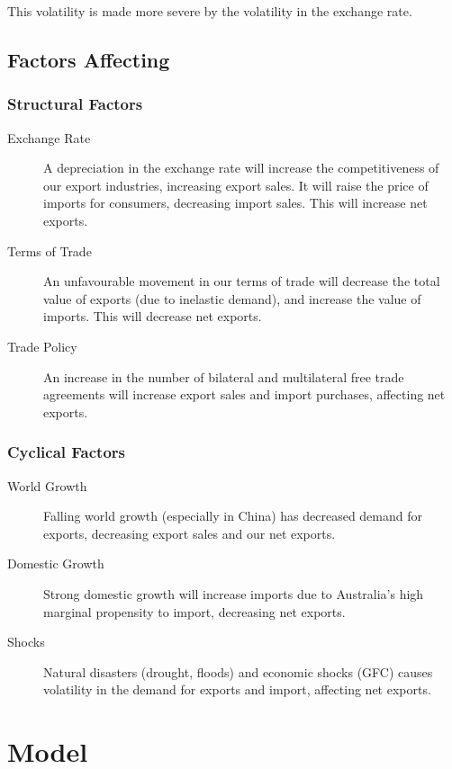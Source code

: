 \documentclass[a4paper,11pt]{article}
\begin{document}
This volatility is made more severe by the volatility in the exchange rate.


\subsection{Factors Affecting}

\subsubsection{Structural Factors}

\begin{description}
\item [Exchange Rate] A depreciation in the exchange rate will increase the
	competitiveness of our export industries, increasing export sales. It will
	raise the price of imports for consumers, decreasing import sales. This
	will increase net exports.
\item [Terms of Trade] An unfavourable movement in our terms of trade will
	decrease the total value of exports (due to inelastic demand), and increase
	the value of imports. This will decrease net exports.
\item [Trade Policy] An increase in the number of bilateral and multilateral
	free trade agreements will increase export sales and import purchases,
	affecting net exports.
\end{description}


\subsubsection{Cyclical Factors}

\begin{description}
\item [World Growth] Falling world growth (especially in China) has decreased
	demand for exports, decreasing export sales and our net exports.
\item [Domestic Growth] Strong domestic growth will increase imports due to
	Australia's high marginal propensity to import, decreasing net exports.
\item [Shocks] Natural disasters (drought, floods) and economic shocks (GFC)
	causes volatility in the demand for exports and import, affecting net
	exports.
\end{description}




\section{Model}
\end{document}
